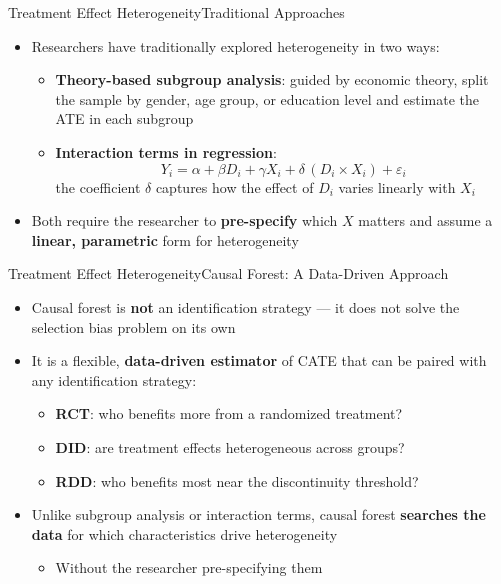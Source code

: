 \documentclass[hyperref={pdfpagelabels=false}]{beamer}
\begin{document}
\begin{frame}{Treatment Effect Heterogeneity}{Traditional Approaches}
\begin{itemize}
  \item Researchers have traditionally explored heterogeneity in two ways:
  \vspace{0.2cm}
  \begin{itemize}
    \item[1.] \textbf{Theory-based subgroup analysis}: guided by economic theory, split the sample by gender, age group, or education level and estimate the ATE in each subgroup
    \vspace{0.15cm}
    \item[2.] \textbf{Interaction terms in regression}:
    \[
      Y_i = \alpha + \beta D_i + \gamma X_i + \delta\,(D_i \times X_i) + \varepsilon_i
    \]
    the coefficient $\delta$ captures how the effect of $D_i$ varies linearly with $X_i$
  \end{itemize}
  \vspace{0.2cm}
  \item Both require the researcher to \textbf{pre-specify} which $X$ matters and assume a \textbf{linear, parametric} form for heterogeneity
\end{itemize}
\end{frame}

\begin{frame}{Treatment Effect Heterogeneity}{Causal Forest: A Data-Driven Approach}
\begin{itemize}
  \item Causal forest is \textbf{not} an identification strategy --- it does not solve the selection bias problem on its own
  \vspace{0.2cm}
  \item It is a flexible, \textbf{data-driven estimator} of CATE that can be paired with any identification strategy:
  \vspace{0.1cm}
  \begin{itemize}
    \item \textbf{RCT}: who benefits more from a randomized treatment?
    \vspace{0.1cm}
    \item \textbf{DID}: are treatment effects heterogeneous across groups?
    \vspace{0.1cm}
    \item \textbf{RDD}: who benefits most near the discontinuity threshold?
  \end{itemize}
  \vspace{0.2cm}
  \item Unlike subgroup analysis or interaction terms, causal forest \textbf{searches the data} for which characteristics drive heterogeneity
    \vspace{0.2cm}
  \begin{itemize}

  \item Without the researcher pre-specifying them
  \end{itemize}

\end{itemize}
\end{frame}
\end{document}
